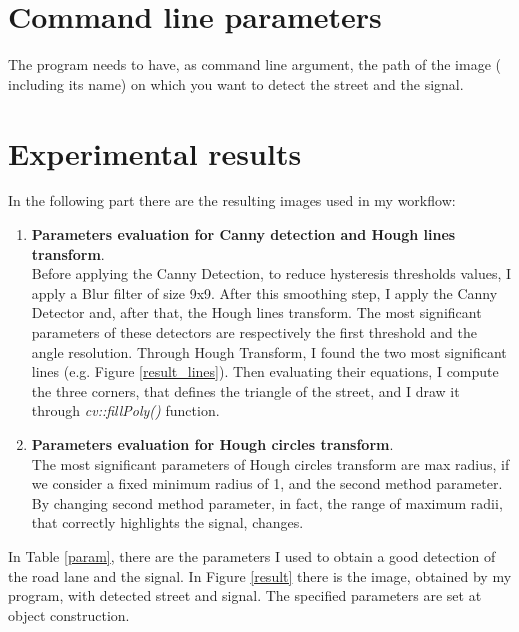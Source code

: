 \documentclass{article}
\begin{document}
\section{Command line parameters}
The program needs to have, as command line argument, the path of the image ( including its name) on which you want to detect the street and the signal. 
\section{Experimental results}
In the following part there are the resulting images used in my workflow:
\begin{enumerate}
\item{\textbf{Parameters evaluation for Canny detection and Hough lines transform}.\\
Before applying the Canny Detection, to reduce hysteresis thresholds values, I apply a Blur filter of size 9x9. After this smoothing step, I apply the Canny Detector and, after that, the Hough lines transform. The most significant parameters of these detectors are respectively the first threshold and the angle resolution. 
Through Hough Transform, I found the two most significant lines (e.g. Figure \ref{result_lines}). Then evaluating their equations, I compute the three corners, that defines the triangle of the street, and I draw it through \textit{cv::fillPoly()} function.
}
\item{\textbf{Parameters evaluation for Hough circles transform}.\\
The most significant parameters of Hough circles transform are max radius, if we consider a fixed minimum radius of 1, and the second method parameter. By changing second method parameter, in fact, the range of maximum radii, that correctly highlights the signal, changes.  
}
\end{enumerate}
In Table \ref{param}, there are the parameters I used to obtain a good detection of the road lane and the signal. In Figure \ref{result} there is the image, obtained by my program, with detected street and signal. The specified parameters are set at object construction.
\end{document}
